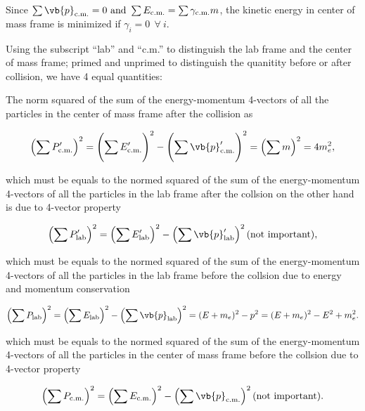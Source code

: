 \documentclass[english,a4paper,12pt]{report}
\begin{document}
{Since \(\sum \vb{p}_{\text{c.m.}}  =0 \text { and } \sum E_{\text{c.m.}} = \sum \gamma _{\text{c.m.}}m  \), the kinetic energy in center of mass frame is minimized if \(\gamma _{i} = 0 ~~\forall~ i \). 

Using the subscript ``lab'' and ``c.m.'' to distinguish the lab frame and the center of mass frame; primed and unprimed to distinguish the quanitity before or after collision, we have 4 equal quantities:

The norm squared of the sum of the energy-momentum 4-vectors of all the particles in the center of mass frame after the collision as 

\begin{equation}
    \left( \sum P_{\text{c.m.}}' \right)^2 = \left( \sum_{}^{} E_{\text{c.m.}}'  \right) ^2 - \left( \sum_{}^{} \vb{p}_{\text{c.m.}}'    \right) ^2  = \left( \sum m \right)^2 = 4 m_{e}^2,
\end{equation}

which must be equals to the normed squared of the sum of the energy-momentum 4-vectors of all the particles in the lab frame after the collsion on the other hand is due to 4-vector property

\begin{equation}
    \left(\sum P_{\text{lab} }' \right)^2 = \left(\sum E_{\text{lab} }'\right)^2 - \left( \sum \vb{p} _{\text{lab} }' \right)^2 \text{(not important)},
\end{equation}

which must be equals to the normed squared of the sum of the energy-momentum 4-vectors of all the particles in the lab frame before the collsion due to energy and momentum conservation

\begin{equation}
    \left(\sum P_{\text{lab} } \right)^2 = \left(\sum E_{\text{lab} }\right)^2 - \left( \sum \vb{p} _{\text{lab} } \right)^2 = (E+m_{e} )^2 - p^2 = (E+m_{e} )^2 - E^2 + m_{e}^2. 
\end{equation}

which must be equals to the normed squared of the sum of the energy-momentum 4-vectors of all the particles in the center of mass frame before the collsion due to 4-vector property

\begin{equation}
    \left(\sum P_{\text{c.m.} } \right)^2 = \left(\sum E_{\text{c.m.} }\right)^2 - \left( \sum \vb{p} _{\text{c.m.} } \right)^2 \text{(not important)}. 
\end{equation}

}
\end{document}
